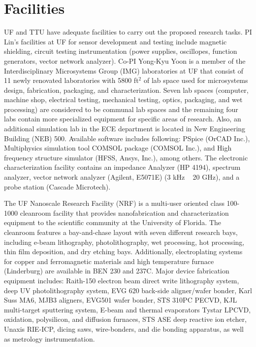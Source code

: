 \section{Facilities}
UF and TTU have adequate facilities to carry out the proposed research tasks.
PI Lin's facilities at UF for sensor development and testing include magnetic shielding, circuit testing instrumentation (power supplies, oscillopes, function generators, vector network analyzer). Co-PI Yong-Kyu Yoon is a member of the Interdisciplinary Microsystems Group (IMG) laboratories at UF that consist of 11 newly renovated laboratories with 5800 ft$^2$ of lab space used for microsystems design, fabrication, packaging, and characterization.  Seven lab spaces (computer, machine shop, electrical testing, mechanical testing, optics, packaging, and wet processing) are considered to be communal lab spaces and the remaining four labs contain more specialized equipment for specific areas of research. Also, an additional simulation lab in the ECE department is located in New Engineering Building (NEB) 500. Available software includes following: PSpice (OrCAD Inc.), Multiphysics simulation tool COMSOL package (COMSOL Inc.), and  High frequency structure simulator (HFSS, Ansys, Inc.), among others. The electronic characterization facility contains an impedance Analyzer (HP 4194),  spectrum analyzer,  vector network analyzer (Agilent, E5071E) (3 kHz ~ 20 GHz), and a probe station (Cascade Microtech).

The UF Nanoscale Research Facility (NRF) is a multi-user oriented class 100-1000 cleanroom facility that provides nanofabrication and characterization equipment to the scientific community at the University of Florida. The cleanroom features a bay-and-chase layout with seven different research bays, including e-beam lithography, photolithography, wet processing, hot processing, thin film deposition, and dry etching bays.  Additionally, electroplating systems for copper and ferromagnetic materials and high temperature furnace (Linderburg) are available in BEN 230 and 237C. Major device fabrication equipment includes: Raith-150 electron beam direct write lithography system, deep UV photolithography system, EVG 620 back-side aligner/wafer bonder, Karl Suss MA6, MJB3 aligners, EVG501 wafer bonder, STS 310PC PECVD, KJL multi-target sputtering system, E-beam and thermal evaporators Tystar LPCVD, oxidation, polysilicon, and diffusion furnaces, STS ASE deep reactive ion etcher, Unaxis RIE-ICP, dicing saws, wire-bonders, and die bonding apparatus, as well as metrology instrumentation.

